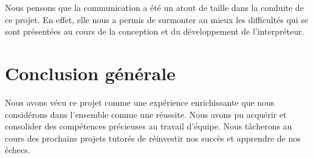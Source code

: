         Nous pensons que la communication a été un atout de taille dans la conduite de
        ce projet. En effet, elle nous a permis de surmonter au mieux les difficultés qui
        se sont présentées au cours de la conception et du développement de l'interpréteur.

\chapter{Conclusion générale}

    Nous avons vécu ce projet comme une expérience enrichissante que nous considérons dans
    l'ensemble comme une réussite. Nous avons pu acquérir et consolider des compétences
    précieuses au travail d'équipe. Nous tâcherons au cours des prochains projets tutorés
    de réinvestir nos succès et apprendre de nos échecs.